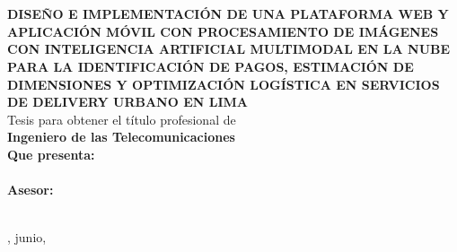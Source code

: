 
\begin{titlepage}
    \centering
    \vspace*{1cm}
    
    {\Large\textbf{\universidad}}\\[0.5cm]
    {\Large\textbf{\facultad}}\\[1.5cm]
    
    
    \vspace{1cm}
    
    {\large\textbf{DISEÑO E IMPLEMENTACIÓN DE UNA PLATAFORMA WEB Y APLICACIÓN MÓVIL CON PROCESAMIENTO DE IMÁGENES CON INTELIGENCIA ARTIFICIAL MULTIMODAL EN LA NUBE PARA LA IDENTIFICACIÓN DE PAGOS, ESTIMACIÓN DE DIMENSIONES Y OPTIMIZACIÓN LOGÍSTICA EN SERVICIOS DE DELIVERY URBANO EN LIMA}}\\[2.5cm]
    
    {\large Tesis para obtener el título profesional de}\\[0.3cm]
    {\large\textbf{Ingeniero de las Telecomunicaciones}}\\[2.5cm]
    
    {\large \textbf{Que presenta:}}\\[0.3cm]
    {\large \autor}\\[2cm]
    
    {\large \textbf{Asesor:}}\\[0.3cm]
    {\large \asesor}\\[2cm]
    
    \vfill
    
    {\large \ciudad, junio, \anio}
\end{titlepage}